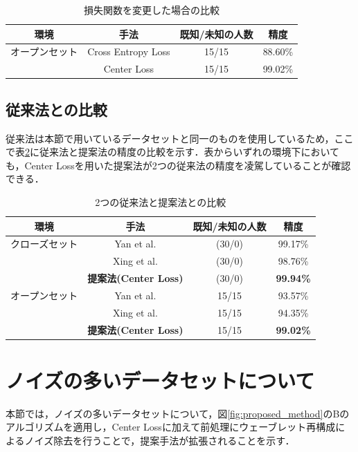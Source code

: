 \begin{table}[H]
\caption{損失関数を変更した場合の比較}
\centering
\begin{tabular}{cccc}
\hline
環境 & 手法 & 既知/未知の人数 & 精度 \\
\hline
オープンセット & Cross Entropy Loss & 15/15 & 88.60\% \\
& Center Loss & 15/15 & 99.02\% \\
\hline
\end{tabular}
\label{table:comparison_loss}
\end{table}

\subsection{従来法との比較}
従来法\cite{paper:HeartSignature, paper:Xing}は本節で用いているデータセットと同一のものを使用しているため，ここで表\ref{table:comparison30}に従来法と提案法の精度の比較を示す．表からいずれの環境下においても，Center Lossを用いた提案法が2つの従来法の精度を凌駕していることが確認できる．

\begin{table}[H]
  \caption{2つの従来法と提案法との比較}
  \centering
  \begin{tabular}{cccc}
  \hline
  環境 & 手法 & 既知/未知の人数 & 精度 \\
  \hline
  クローズセット & Yan et al.\cite{paper:HeartSignature} & (30/0) & 99.17\% \\
  & Xing et al.\cite{paper:Xing} & (30/0) & 98.76\% \\
  & \textbf{提案法(Center Loss)} & (30/0) & \textbf{99.94\%} \\
  \hline
  オープンセット & Yan et al.\cite{paper:HeartSignature} & 15/15 & 93.57\% \\
  & Xing et al.\cite{paper:Xing} & 15/15 & 94.35\% \\
  & \textbf{提案法(Center Loss)} & 15/15 & \textbf{99.02\%} \\
  \hline
  \end{tabular}
  \label{table:comparison30}
\end{table}


\section{ノイズの多いデータセットについて}
本節では，ノイズの多いデータセットについて，図\ref{fig:proposed_method}のBのアルゴリズムを適用し，Center Lossに加えて前処理にウェーブレット再構成によるノイズ除去を行うことで，提案手法が拡張されることを示す．
